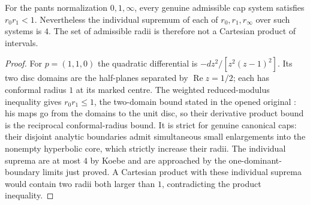 \begin{corollary}
\label{A2-nonbox}
For the pants normalization $0,1,\infty$, every genuine admissible cap
system satisfies $r_0r_1<1$. Nevertheless the individual supremum of
each of $r_0,r_1,r_\infty$ over such systems is $4$. The set of
admissible radii is therefore not a Cartesian product of intervals.
\end{corollary}
\begin{proof}
For $p=(1,1,0)$ the quadratic differential is
$-dz^2/[z^2(z-1)^2]$. Its two disc domains are the half-planes separated
by $\operatorname{Re}z=1/2$; each has conformal radius $1$ at its marked
centre. The weighted reduced-modulus inequality gives $r_0r_1\leq1$,
the two-domain bound stated in the opened original
\cite[Part I, \S2, Theorem3, pp.~169--173]{ALavrentiev1934}:
his maps go from the domains to the unit disc, so their derivative
product bound is the reciprocal conformal-radius bound. It is strict for genuine
canonical caps: their disjoint analytic boundaries admit simultaneous
small enlargements into the nonempty hyperbolic core, which strictly
increase their radii. The individual suprema are at most $4$ by Koebe
and are approached by the one-dominant-boundary limits just proved.
A Cartesian product with these individual suprema would contain two
radii both larger than $1$, contradicting the product inequality.
\end{proof}
